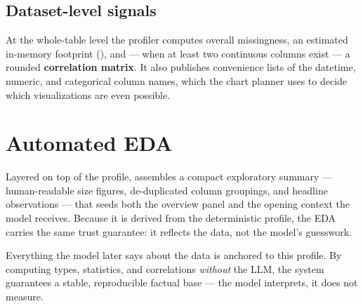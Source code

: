 \subsection{Dataset-level signals}
At the whole-table level the profiler computes overall missingness, an estimated
in-memory footprint (), and --- when at least two
continuous columns exist --- a rounded \textbf{correlation matrix}. It also
publishes convenience lists of the datetime, numeric, and categorical column
names, which the chart planner uses to decide which visualizations are even
possible.

\section{Automated EDA}
Layered on top of the profile,  assembles a compact
exploratory summary --- human-readable size figures, de-duplicated column
groupings, and headline observations --- that seeds both the overview panel and
the opening context the model receives. Because it is derived from the
deterministic profile, the EDA carries the same trust guarantee: it reflects the
data, not the model's guesswork.

\begin{uanote}
Everything the model later says about the data is anchored to this profile. By
computing types, statistics, and correlations \emph{without} the LLM, the system
guarantees a stable, reproducible factual base --- the model interprets, it does
not measure.
\end{uanote}
